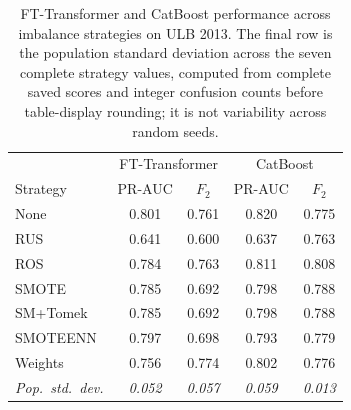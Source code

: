\begin{table}[H]
\centering
\caption{FT-Transformer and CatBoost performance across imbalance strategies on ULB 2013. The final row is the population standard deviation across the seven complete strategy values, computed from complete saved scores and integer confusion counts before table-display rounding; it is not variability across random seeds.}
\label{tab:transformer_robustness_ulb}
\begin{tabular}{l cc cc}
\toprule
& \multicolumn{2}{c}{FT-Transformer} & \multicolumn{2}{c}{CatBoost} \\
Strategy & PR-AUC & $F_2$ & PR-AUC & $F_2$ \\
\midrule
None      & 0.801 & 0.761 & 0.820 & 0.775 \\
RUS       & 0.641 & 0.600 & 0.637 & 0.763 \\
ROS       & 0.784 & 0.763 & 0.811 & 0.808 \\
SMOTE     & 0.785 & 0.692 & 0.798 & 0.788 \\
SM+Tomek  & 0.785 & 0.692 & 0.798 & 0.788 \\
SMOTEENN  & 0.797 & 0.698 & 0.793 & 0.779 \\
Weights   & 0.756 & 0.774 & 0.802 & 0.776 \\
\midrule
\textit{Pop.\ std.\ dev.} & \textit{0.052} & \textit{0.057} & \textit{0.059} & \textit{0.013} \\
\bottomrule
\end{tabular}
\end{table}
